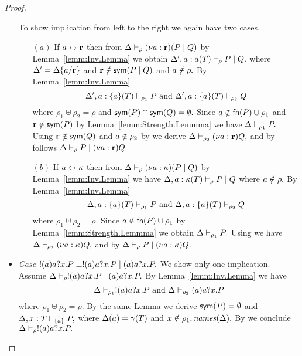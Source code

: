 \begin{proof}
\begin{itemize}
To show implication from left to the right we again have two cases.
\begin{itemize}
\item [$(a)$] If $a \leftrightarrow {\mathbf{r}}$ then from $ \Delta\vdash_\rho (\nu a: {\mathbf{r}}) ( P\;|\; Q)$ by Lemma~\ref{lemm:Inv.Lemma} we obtain $ \Delta', a: a(T)\vdash_{\rho} P \;|\; Q$, where $\Delta'=\Delta\{a/{\mathbf{r}}\}$ and ${\mathbf{r}} \notin\mathsf{sym}(P\;|\; Q)$ and $a\notin \rho.$ By Lemma~\ref{lemm:Inv.Lemma} 
\[ 
\Delta', a:\{a\}(T)\vdash_{\rho_1} P \text{ and } \Delta', a: \{a\}(T)\vdash_{\rho_2}  Q
\] 
where $\rho_1\uplus\rho_2=\rho$ and $\mathsf{sym}(P) \cap \mathsf{sym}(Q)=\emptyset.$  Since $a\notin\mathsf{fn}(P)\cup \rho_1$ and ${\mathbf{r}}\notin \mathsf{sym}(P)$ by Lemma~\ref{lemm:Strength.Lemmma} we have $\Delta \vdash_{\rho_1} P.$ 
Using ${\mathbf{r}}\notin\mathsf{sym}(Q)$ and $a\notin\rho_2$ by  we derive $ \Delta \vdash_{\rho_2}  (\nu a: {\mathbf{r}})Q,$ and by  follows $\Delta \vdash_\rho P \;|\; (\nu a: {\mathbf{r}}) Q.$
%
\item [$(b)$] If $a \leftrightarrow {\mathbf{\kappa}}$ then from $ \Delta\vdash_\rho (\nu a: {\mathbf{\kappa}}) ( P\;|\; Q)$ by Lemma~\ref{lemm:Inv.Lemma} we have $ \Delta, a: {\mathbf{\kappa}}(T)\vdash_{\rho} P \;|\; Q$ where $a\notin \rho.$ By Lemma~\ref{lemm:Inv.Lemma} 
\[ 
\Delta, a: \{a\}(T)\vdash_{\rho_1} P \text{ and } \Delta, a: \{a\}(T)\vdash_{\rho_2}  Q
\] 
where $\rho_1\uplus\rho_2=\rho.$ Since $a\notin\mathsf{fn}(P)\cup \rho_1$ by Lemma~\ref{lemm:Strength.Lemmma} we obtain $ \Delta \vdash_{\rho_1} P.$ 
Using  we have $ \Delta \vdash_{\rho_2}  (\nu a: {\mathbf{\kappa}})Q,$ and by  $ \Delta \vdash_\rho P \;|\; (\nu a: {\mathbf{\kappa}}) Q.$
\end{itemize}


\item \emph{Case} $!(a)a?x.P \equiv !(a)a?x.P \;|\; (a)a?x.P.$ We show only one implication. Assume $ \Delta\vdash_\rho !(a)a?x.P \;|\; (a)a?x.P.$ By Lemma~\ref{lemm:Inv.Lemma} we have 
\[ 
\Delta\vdash_{\rho_1} !(a)a?x.P \text{ and } \Delta\vdash_{\rho_2} (a)a?x.P
\] 
where $\rho_1\uplus\rho_2=\rho.$ By the same Lemma we derive $\mathsf{sym}(P)=\emptyset$ and $\Delta, x: T\vdash_{\{a\}} P,$ where $\Delta(a)=\gamma(T)$ and $x \notin \rho_1, \mathit{names}(\Delta).$ By  we conclude $ \Delta\vdash_{\rho} !(a)a?x.P.$

\end{itemize}
\end{proof}


